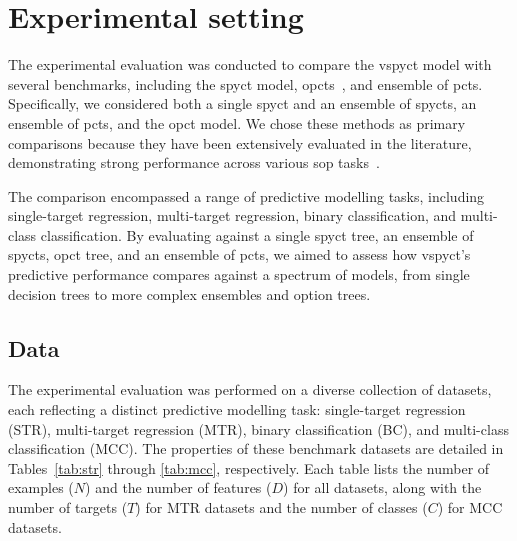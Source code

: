 \documentclass[3p,review,authoryear]{elsarticle}
\begin{document}
\section{Experimental setting}

The experimental evaluation was conducted to compare the \gls{vspyct} model with several benchmarks, including the \gls{spyct} model, \glspl{opct}~\citep{Stepisnik_2020}, and ensemble of \glspl{pct}.
Specifically, we considered both a single \gls{spyct} and an ensemble of \glspl{spyct}, an ensemble of \glspl{pct}, and the \gls{opct} model.
We chose these methods as primary comparisons because they have been extensively evaluated in the literature, demonstrating strong performance across various \gls{sop} tasks~\citep{Andonovikj_2024, Stepi_nik_2021}.

The comparison encompassed a range of predictive modelling tasks, including single-target regression, multi-target regression, binary classification, and multi-class classification.
By evaluating against a single \gls{spyct} tree, an ensemble of \glspl{spyct}, \gls{opct} tree, and an ensemble of \glspl{pct}, we aimed to assess how \gls{vspyct}'s predictive performance compares against a spectrum of models, from single decision trees to more complex ensembles and option trees.

\subsection{Data}

The experimental evaluation was performed on a diverse collection of datasets, each reflecting a distinct predictive modelling task: single-target regression (STR), multi-target regression (MTR), binary classification (BC), and multi-class classification (MCC).
The properties of these benchmark datasets are detailed in Tables~\ref{tab:str} through \ref{tab:mcc}, respectively.
Each table lists the number of examples (\(N\)) and the number of features (\(D\)) for all datasets, along with the number of targets (\(T\)) for MTR datasets and the number of classes (\(C\)) for MCC datasets.
\end{document}
